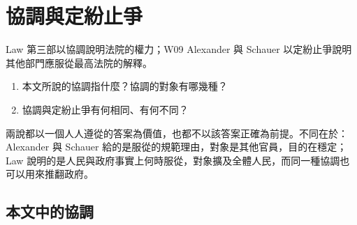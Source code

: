 \chapter{協調與定紛止爭}
\label{ch:60_coordination}

\begin{qaquestion}
Law 第三部以協調說明法院的權力；W09 Alexander 與 Schauer 以定紛止爭說明其他部門應服從最高法院的解釋。
\begin{enumerate}
\tightlist
\item 本文所說的協調指什麼？協調的對象有哪幾種？
\item 協調與定紛止爭有何相同、有何不同？
\end{enumerate}
\end{qaquestion}

兩說都以一個人人遵從的答案為價值，也都不以該答案正確為前提。不同在於：Alexander 與 Schauer 給的是服從的規範理由，對象是其他官員，目的在穩定；Law 說明的是人民與政府事實上何時服從，對象擴及全體人民，而同一種協調也可以用來推翻政府。

\section{本文中的協調}
\label{sec:60_coordination-1}

